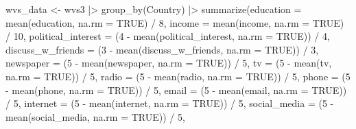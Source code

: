 \documentclass[
]{article}
\newenvironment{Shaded}{\begin{snugshade}}{\end{snugshade}}
\newcommand{\AttributeTok}[1]{\textcolor[rgb]{0.77,0.63,0.00}{#1}}
\newcommand{\ConstantTok}[1]{\textcolor[rgb]{0.00,0.00,0.00}{#1}}
\newcommand{\DecValTok}[1]{\textcolor[rgb]{0.00,0.00,0.81}{#1}}
\newcommand{\FunctionTok}[1]{\textcolor[rgb]{0.00,0.00,0.00}{#1}}
\newcommand{\NormalTok}[1]{#1}
\newcommand{\OtherTok}[1]{\textcolor[rgb]{0.56,0.35,0.01}{#1}}
\newcommand{\SpecialCharTok}[1]{\textcolor[rgb]{0.00,0.00,0.00}{#1}}
\begin{document}
\begin{Shaded}
\begin{Highlighting}[]
\NormalTok{wvs\_data }\OtherTok{\textless{}{-}}\NormalTok{ wvs3 }\SpecialCharTok{|\textgreater{}}
  \FunctionTok{group\_by}\NormalTok{(Country) }\SpecialCharTok{|\textgreater{}}
  \FunctionTok{summarize}\NormalTok{(}\AttributeTok{education =} \FunctionTok{mean}\NormalTok{(education, }\AttributeTok{na.rm =} \ConstantTok{TRUE}\NormalTok{) }\SpecialCharTok{/} \DecValTok{8}\NormalTok{,}
         \AttributeTok{income =} \FunctionTok{mean}\NormalTok{(income, }\AttributeTok{na.rm =} \ConstantTok{TRUE}\NormalTok{) }\SpecialCharTok{/} \DecValTok{10}\NormalTok{,}
         \AttributeTok{political\_interest =}\NormalTok{ (}\DecValTok{4} \SpecialCharTok{{-}} \FunctionTok{mean}\NormalTok{(political\_interest, }\AttributeTok{na.rm =} \ConstantTok{TRUE}\NormalTok{)) }\SpecialCharTok{/} \DecValTok{4}\NormalTok{,}
         \AttributeTok{discuss\_w\_friends =}\NormalTok{ (}\DecValTok{3} \SpecialCharTok{{-}} \FunctionTok{mean}\NormalTok{(discuss\_w\_friends, }\AttributeTok{na.rm =} \ConstantTok{TRUE}\NormalTok{)) }\SpecialCharTok{/} \DecValTok{3}\NormalTok{,}
         \AttributeTok{newspaper =}\NormalTok{ (}\DecValTok{5} \SpecialCharTok{{-}} \FunctionTok{mean}\NormalTok{(newspaper, }\AttributeTok{na.rm =} \ConstantTok{TRUE}\NormalTok{)) }\SpecialCharTok{/} \DecValTok{5}\NormalTok{,}
         \AttributeTok{tv =}\NormalTok{ (}\DecValTok{5} \SpecialCharTok{{-}} \FunctionTok{mean}\NormalTok{(tv, }\AttributeTok{na.rm =} \ConstantTok{TRUE}\NormalTok{)) }\SpecialCharTok{/} \DecValTok{5}\NormalTok{,}
         \AttributeTok{radio =}\NormalTok{ (}\DecValTok{5} \SpecialCharTok{{-}} \FunctionTok{mean}\NormalTok{(radio, }\AttributeTok{na.rm =} \ConstantTok{TRUE}\NormalTok{)) }\SpecialCharTok{/} \DecValTok{5}\NormalTok{,}
         \AttributeTok{phone =}\NormalTok{ (}\DecValTok{5} \SpecialCharTok{{-}} \FunctionTok{mean}\NormalTok{(phone, }\AttributeTok{na.rm =} \ConstantTok{TRUE}\NormalTok{)) }\SpecialCharTok{/} \DecValTok{5}\NormalTok{,}
         \AttributeTok{email =}\NormalTok{ (}\DecValTok{5} \SpecialCharTok{{-}} \FunctionTok{mean}\NormalTok{(email, }\AttributeTok{na.rm =} \ConstantTok{TRUE}\NormalTok{)) }\SpecialCharTok{/} \DecValTok{5}\NormalTok{,}
         \AttributeTok{internet =}\NormalTok{ (}\DecValTok{5} \SpecialCharTok{{-}} \FunctionTok{mean}\NormalTok{(internet, }\AttributeTok{na.rm =} \ConstantTok{TRUE}\NormalTok{)) }\SpecialCharTok{/} \DecValTok{5}\NormalTok{,}
         \AttributeTok{social\_media =}\NormalTok{ (}\DecValTok{5} \SpecialCharTok{{-}} \FunctionTok{mean}\NormalTok{(social\_media, }\AttributeTok{na.rm =} \ConstantTok{TRUE}\NormalTok{)) }\SpecialCharTok{/} \DecValTok{5}\NormalTok{,}

\end{Highlighting}
\end{Shaded}
\end{document}
